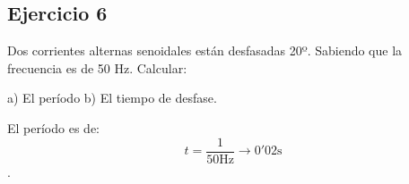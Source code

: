 \documentclass[spanish,openany]{report}
\date{\today}
\begin{document}

%
%
%
\subsection*{Ejercicio 6}
Dos corrientes alternas senoidales están desfasadas 20º. Sabiendo que la frecuencia es de 50 Hz. Calcular:


a) El período\hspace{5em}  b) El tiempo de desfase.


 El período es de: \[t = \frac{1}{50\si{\hertz}} \to  0'02\si{\second}\].
\end{document}
